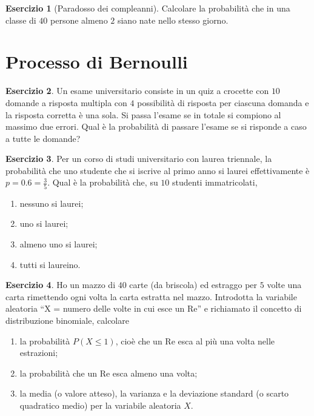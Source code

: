 \documentclass[12pt,a4paper]{article}
\theoremstyle{definition}
\newtheorem{exe}{Esercizio}
\begin{document}
\begin{exe}[Paradosso dei compleanni]
	Calcolare la probabilità che in una classe di $ 40 $ persone almeno $ 2 $ siano nate nello stesso giorno.
\end{exe}

\section{Processo di Bernoulli}

\begin{exe}
	Un esame universitario consiste in un quiz a crocette con $ 10 $ domande a risposta multipla con $ 4 $ possibilità di risposta per ciascuna domanda e la risposta corretta è una sola. Si passa l'esame se in totale si compiono al massimo due errori. Qual è la probabilità di passare l'esame se si risponde a caso a tutte le domande?
\end{exe}

\begin{exe}
	Per un corso di studi universitario con laurea triennale, la probabilità che uno studente
	che si iscrive al primo anno si laurei effettivamente è $ p = 0.6 = \frac35 $. Qual è la probabilità che, su $ 10 $ studenti immatricolati,
	\begin{enumerate}
		\item  nessuno si laurei;
		\item uno si laurei;
		\item almeno uno si laurei;
		\item tutti si laureino.
	\end{enumerate}
\end{exe}

\begin{exe}
	Ho un mazzo di $ 40 $ carte (da briscola) ed estraggo per $ 5 $ volte una carta rimettendo ogni
	volta la carta estratta nel mazzo. Introdotta la variabile aleatoria “X = numero delle volte in cui esce un Re” e richiamato il concetto di distribuzione binomiale, calcolare
	\begin{enumerate}
		\item la probabilità $ P({X \le 1}) $, cioè che un Re esca al più una volta nelle estrazioni;
		\item la probabilità che un Re esca almeno una volta;
		\item la media (o valore atteso), la varianza e la deviazione standard (o scarto quadratico medio) per la variabile aleatoria $ X $.
	\end{enumerate}
\end{exe}
\end{document}
